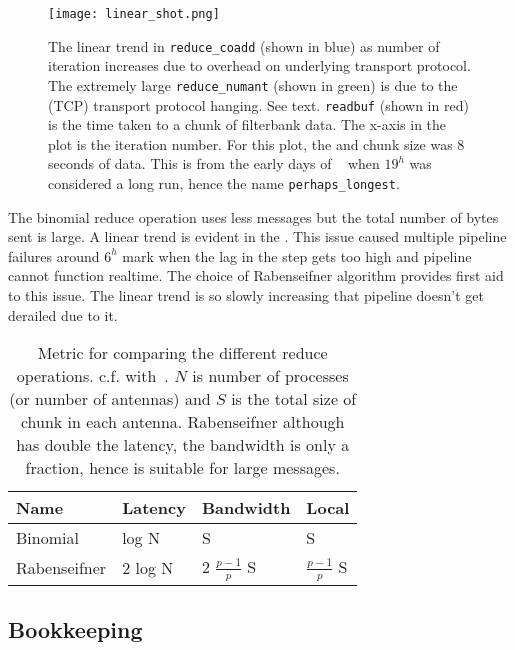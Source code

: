 \begin{figure}
	\label{fig:linearshot}
	\centering
	\texttt{[image: linear\_shot.png]}
	\caption{The linear trend in \texttt{reduce\_coadd} (shown in blue) as number of iteration increases due to overhead on underlying transport protocol.
		The extremely large \texttt{reduce\_numant} (shown in green) is due to the (TCP) transport protocol hanging. See text.
		\texttt{readbuf} (shown in red) is the time taken to a chunk of filterbank data. 
		The x-axis in the plot is the iteration number. For this plot, the  and chunk size was $8$ seconds of data. 
		This is from the early days of \vf~ when $19^h$ was considered a long run, hence the name \texttt{perhaps\_longest}.
	 }
\end{figure}

\par The binomial reduce operation uses less messages but the total number of bytes sent is large. 
A linear trend is evident in the . This issue caused multiple pipeline failures around $6^h$ mark when the lag in the step gets too high and pipeline cannot function realtime.
The choice of Rabenseifner algorithm provides first aid to this issue. The linear trend is so slowly increasing that pipeline doesn't get derailed due to it.

\begin{table}
\end{table}
\begin{table}[]
	\label{tab:reducemetric}
	\begin{tabular}{@{}llll@{}}
		\toprule
		Name & Latency & Bandwidth & Local \\ \midrule
		Binomial & log N & S & S \\
		Rabenseifner & 2 log N & 2 $\frac{p-1}{p}$ S & $\frac{p-1}{p}$ S \\ \bottomrule
	\end{tabular}
	\caption{Metric for comparing the different reduce operations. c.f. with~\cite{raben}.
		$N$ is number of processes (or number of antennas) and $S$ is the total size of chunk in each antenna.
		Rabenseifner although has double the latency, the bandwidth is only a fraction, hence is suitable for large messages.
	}
\end{table}

\subsection{Bookkeeping}
\label{ssub:bcast}

